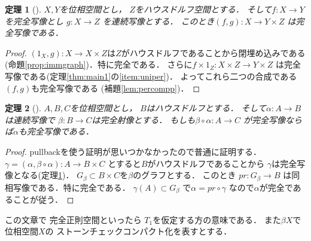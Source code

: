 \documentclass[leqno, a4paper, 12pt, dvipdfmx]{jsarticle}
\newtheorem{thm}{定理}
\begin{document}
\begin{thm}[]\label{thm:mic1}
$X, Y$を位相空間とし，
$Z$をハウスドルフ空間とする．
そして$f\colon X\to Y$を完全写像とし
$g\colon X\to Z$
を連続写像とする．
このとき$(f, g)\colon X\to Y\times Z$
は完全写像である．
\end{thm}
\begin{proof}

$(1_{X}, g)\colon X\to X\times Z$は$Z$がハウスドルフであることから閉埋め込みである(命題\ref{prop:immgraph})．特に完全である．
さらに$f\times 1_{Z}\colon X\times Z\to Y\times Z$
は完全写像である(定理\ref{thm:main1}の\ref{item:uniper})．
よってこれら二つの合成である$(f, g)$も完全写像である
(補題\ref{lem:percompp})．
\end{proof}

\begin{thm}[]\label{thm:mic2}
$A, B,  C$を位相空間とし，
$B$はハウスドルフとする．
そして$\alpha\colon A\to B$は連続写像で
$\beta\colon B\to C$は完全射像とする．
もしも$\beta\circ \alpha\colon A\to C$
が完全写像ならば$\alpha$も完全写像である．
\end{thm}
\begin{proof}
pullbackを使う証明が思いつかなかったので普通に証明する．
$\gamma=(\alpha, \beta\circ \alpha)\colon A\to B\times C$
とすると$B$がハウスドルフであることから
$\gamma$は完全写像となる(定理\ref{thm:mic1})．
$G_{\beta}\subset B\times C$を$\beta$のグラフとする．
このとき
$pr\colon G_{\beta}\to B$
は同相写像である．特に完全である．
$\gamma(A)\subset G_{\beta}$
で$\alpha=pr\circ \gamma$
なので$\alpha$が完全であることが従う．
\end{proof}





この文章で
完全正則空間といったら
$T_{1}$を仮定する方の意味である．
また$\beta X$で位相空間$X$の
ストーンチェックコンパクト化を表すとする．
\end{document}
